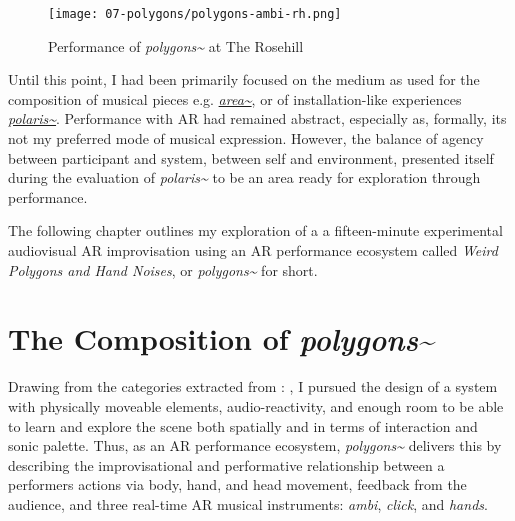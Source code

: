 \begin{figure}
    \centering
    \texttt{[image: 07-polygons/polygons-ambi-rh.png]}
    \caption{Performance of \textit{polygons\textasciitilde{}} at The Rosehill}
    \label{fig: polygons-ambi-rh}
\end{figure}

Until this point, I had been primarily focused on the medium as used for the composition of musical pieces e.g. \hyperref[sec: area]{\textit{area\textasciitilde{}}}, or of installation-like experiences \hyperref[sec: polaris]{\textit{polaris\textasciitilde{}}}. Performance with AR had remained abstract, especially as, formally, its not my preferred mode of musical expression. However, the balance of agency between participant and system, between self and environment, presented itself during the evaluation of \textit{polaris\textasciitilde{}} to be an area ready for exploration through performance. 

The following chapter outlines my exploration of a a fifteen-minute experimental audiovisual AR improvisation using an AR performance ecosystem called \textit{Weird Polygons and Hand Noises}, or \textit{polygons\textasciitilde{}} for short.



\section{The Composition of \textit{polygons\textasciitilde{}}} \label{sec: polygons-composition}

Drawing from the categories extracted from : , I pursued the design of a system with physically moveable elements, audio-reactivity, and enough room to be able to learn and explore the scene both spatially and in terms of interaction and sonic palette. Thus, as an AR performance ecosystem, \textit{polygons\textasciitilde{}} delivers this by describing the improvisational and performative relationship between a performers actions via body, hand, and head movement, feedback from the audience, and three real-time AR musical instruments: \textit{ambi}, \textit{click}, and \textit{hands}. 


